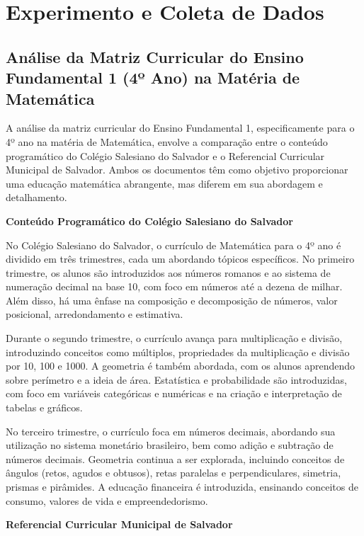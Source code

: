 \chapter{Experimento e Coleta de Dados}\label{chp:exp}




\section{Análise da Matriz Curricular do Ensino Fundamental 1 (4º Ano) na Matéria de Matemática}

A análise da matriz curricular do Ensino Fundamental 1, especificamente para o 4º ano na matéria de Matemática, envolve a comparação entre o conteúdo programático do Colégio Salesiano do Salvador e o Referencial Curricular Municipal de Salvador. Ambos os documentos têm como objetivo proporcionar uma educação matemática abrangente, mas diferem em sua abordagem e detalhamento.

\item \textbf{Conteúdo Programático do Colégio Salesiano do Salvador}

 No Colégio Salesiano do Salvador, o currículo de Matemática para o 4º ano é dividido em três trimestres, cada um abordando tópicos específicos. No primeiro trimestre, os alunos são introduzidos aos números romanos e ao sistema de numeração decimal na base 10, com foco em números até a dezena de milhar. Além disso, há uma ênfase na composição e decomposição de números, valor posicional, arredondamento e estimativa. 

Durante o segundo trimestre, o currículo avança para multiplicação e divisão, introduzindo conceitos como múltiplos, propriedades da multiplicação e divisão por 10, 100 e 1000. A geometria é também abordada, com os alunos aprendendo sobre perímetro e a ideia de área. Estatística e probabilidade são introduzidas, com foco em variáveis categóricas e numéricas e na criação e interpretação de tabelas e gráficos.

No terceiro trimestre, o currículo foca em números decimais, abordando sua utilização no sistema monetário brasileiro, bem como adição e subtração de números decimais. Geometria continua a ser explorada, incluindo conceitos de ângulos (retos, agudos e obtusos), retas paralelas e perpendiculares, simetria, prismas e pirâmides. A educação financeira é introduzida, ensinando conceitos de consumo, valores de vida e empreendedorismo. \cite{conteudo_programatico_salesiano}

\item \textbf{Referencial Curricular Municipal de Salvador}

